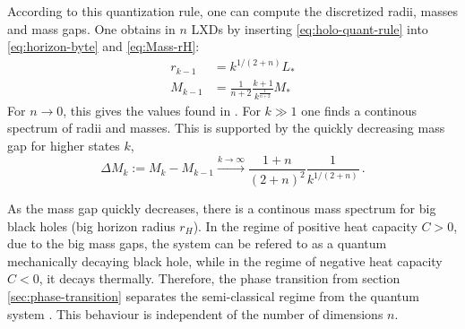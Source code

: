 \documentclass[12pt,a4paper]{report}
\numberwithin{equation}{chapter}
\begin{document}
According to this quantization rule, one can compute the discretized radii, masses and mass gaps. One obtains in $n$ LXDs by inserting \eqref{eq:holo-quant-rule} into \eqref{eq:horizon-byte} and \eqref{eq:Mass-rH}:
\begin{align}
r_{k-1} &= k^{1/(2+n)} L_* \\
\label{eq:mass-quant-holo}
M_{k-1} &= \frac{1}{n+2}\frac{k+1}{ k^\frac{1}{n+2} } M_*
\end{align}
For $n\to0$, this gives the values found in \cite{NS2013}. For $k\gg1$ one finds a continous spectrum of radii and masses. This is supported by the quickly decreasing mass gap for higher states $k$,
\begin{equation}
\Delta M_k := M_k - M_{k-1} 
\xrightarrow{k\to\infty}
\frac{1+n}{(2+n)^2} \frac{1}{k^{1/(2+n)}}
\,.
\end{equation}

As the mass gap quickly decreases, there is a continous mass spectrum for big black holes (big horizon radius $r_H$). In the regime of positive heat capacity $C>0$, due to the big mass gaps, the system can be refered to as a quantum mechanically decaying black hole, while in the regime of negative heat capacity $C<0$, it decays thermally. Therefore, the phase transition from section \ref{sec:phase-transition} separates the semi-classical regime from the quantum system \cite{NS2013}. This behaviour is independent of the number of dimensions $n$.
\end{document}
